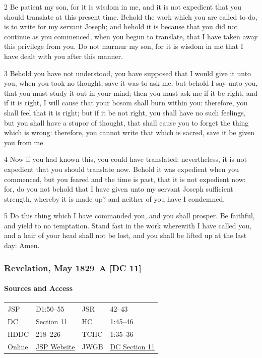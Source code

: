 				2 Be patient my son, for it is wisdom in me, and it is not expedient that you should translate at this present time. Behold the work which you are called to do, is to write for my servant Joseph; and behold it is because that you did not continue as you commenced, when you begun to translate, that I have taken away this privilege from you. Do not murmur my son, for it is wisdom in me that I have dealt with you after this manner.
				
				3 Behold you have not understood, you have supposed that I would give it unto you, when you took no thought, save it was to ask me; but behold I say unto you, that you must study it out in your mind; then you must ask me if it be right, and if it is right, I will cause that your bosom shall burn within you: therefore, you shall feel that it is right; but if it be not right, you shall have no such feelings, but you shall have a stupor of thought, that shall cause you to forget the thing which is wrong: therefore, you cannot write that which is sacred, save it be given you from me.
				
				4 Now if you had known this, you could have translated: nevertheless, it is not expedient that you should translate now. Behold it was expedient when you commenced, but you feared and the time is past, that it is not expedient now: for, do you not behold that I have given unto my servant Joseph sufficient strength, whereby it is made up? and neither of you have I condemned.
				
				5 Do this thing which I have commanded you, and you shall prosper. Be faithful, and yield to no temptation. Stand fast in the work wherewith I have called you, and a hair of your head shall not be lost, and you shall be lifted up at the last day: Amen.
			
		\subsubsection{Revelation, May 1829--A [DC 11]}
			\label{EMS-1828-1829-JS-MAY-1829-A}
			
			\paragraph{Sources and Access}

				\begin{tabular}{p{1in}p{1.5in}p{1in}p{1.5in}}
				JSP	 	& D1:50--55		& JSR 		& 42--43	 \\  
				DC	 	& Section 11 	& HC 		& 1:45--46	 \\
				HDDC 	& 218--226 		& TCHC 		& 1:35--36	 \\
				Online  & \href{https://www.josephsmithpapers.org/paper-summary/revelation-may-1829-a-dc-11/1}{JSP Website} & 
				JWGB	& \hyperref[DC11]{DC Section 11} \\
				\end{tabular}
			
